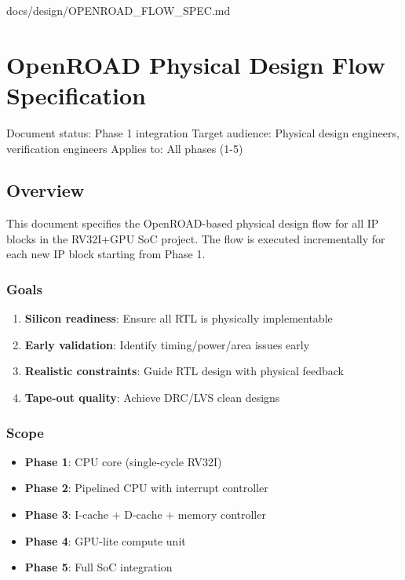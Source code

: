 \begin{relocated}{docs/design/OPENROAD_FLOW_SPEC.md}
\section{OpenROAD Physical Design Flow Specification}\label{tm:pd:openroad-flow}

Document status: Phase 1 integration Target audience: Physical design
engineers, verification engineers Applies to: All phases (1-5)

\subsection{Overview}\label{tm:pd:openroad-flow:overview}

This document specifies the OpenROAD-based physical design flow for all
IP blocks in the RV32I+GPU SoC project. The flow is executed
incrementally for each new IP block starting from Phase 1.

\subsubsection{Goals}\label{tm:pd:openroad-flow:goals}

\begin{enumerate}
\def\labelenumi{\arabic{enumi}.}
\tightlist
\item
  \textbf{Silicon readiness}: Ensure all RTL is physically implementable
\item
  \textbf{Early validation}: Identify
  timing/\allowbreak{}power/\allowbreak{}area issues early
\item
  \textbf{Realistic constraints}: Guide RTL design with physical
  feedback
\item
  \textbf{Tape-out quality}: Achieve DRC/LVS clean designs
\end{enumerate}

\subsubsection{Scope}\label{tm:pd:openroad-flow:scope}

\begin{itemize}
\tightlist
\item
  \textbf{Phase 1}: CPU core (single-cycle RV32I)
\item
  \textbf{Phase 2}: Pipelined CPU with interrupt controller
\item
  \textbf{Phase 3}: I-cache + D-cache + memory controller
\item
  \textbf{Phase 4}: GPU-lite compute unit
\item
  \textbf{Phase 5}: Full SoC integration
\end{itemize}


\end{relocated}
